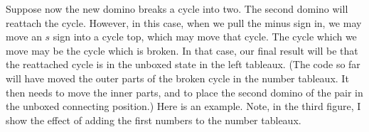 \documentclass[12pt]{article}
\numberwithin{equation}{section}
\newcommand{\horizontalDominoRSShift}[4]{\filldraw [dominoRSStyle] (#2 - 1 + #4 + \eps, #1 - 1 + \eps) rectangle + (2 - \teps, 1 -\teps) node [dominoText] {$#3$};}
\newcommand{\verticalDominoRSShift}[4]{\filldraw [dominoRSStyle] (#2 - 1 + #4 + \eps,  #1 - 1 + \eps) rectangle + (1 - \teps,2 -\teps) node [dominoText] {$#3$};}
\begin{document}
\begin{itemize}
\begin{itemize}
      Suppose now the new domino breaks a cycle into two.  The second domino will reattach the cycle.
      However, in this case, when we pull the minus sign in, we may move an $s$ sign into a cycle top, which may move that cycle.
      The cycle which we move may be the cycle which is broken.
      In that case, our final result will be that the reattached cycle is in the unboxed state in the left tableaux.
      (The code so far will have moved the outer parts of the broken cycle in the number tableaux.
      It then needs to move the inner parts, and to place the second domino of the pair in the unboxed connecting position.)
      Here is an example.
      Note, in the third figure, I show the effect of adding the first numbers to the number tableaux.
      \begin{figure}[H]
        \centering
\end{figure}
\end{itemize}
\end{itemize}
\end{document}
